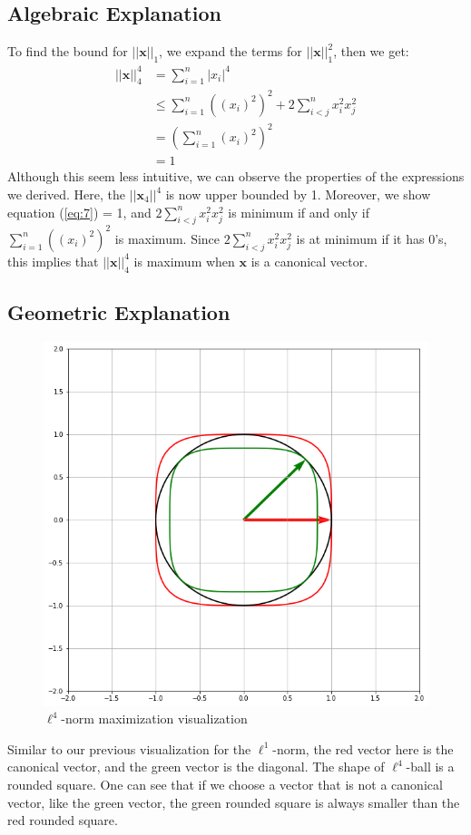 \documentclass[11pt]{article}
\begin{document}
\subsection{Algebraic Explanation}
	To find the bound for $||\bm{x}||_1$, we expand the terms for $||\bm{x}||_1^2$, then we get:
	\begin{align}
    	||\bm{x}||_4^4 
    		&= \sum^{n}_{i=1} |x_{i}|^{4} \\
			&\leq \sum^{n}_{i=1} ((x_{i})^{2})^{2} + 2\sum^{n}_{i<j} x_{i}^{2}x_{j}^{2}\label{eq:7}\\
			&= (\sum^{n}_{i=1} (x_{i})^2)^{2} \\
			&= 1
	\end{align}
	Although this seem less intuitive, we can observe the properties of the expressions we derived. Here, the $||\bm{x}_{4}||^{4}$
	is now upper bounded by 1. Moreover, we show equation (\ref{eq:7}) = 1, and $2\sum^{n}_{i<j} x_{i}^{2}x_{j}^{2}$
	is minimum if and only if $\sum^{n}_{i=1} ((x_{i})^{2})^{2}$ is maximum. Since $2\sum^{n}_{i<j} x_{i}^{2}x_{j}^{2}$ is at minimum 
	if it has 0's, this implies that $||\bm{x}||_4^4$ is maximum when $\bm{x}$ is a canonical vector. 
	

\subsection{Geometric Explanation}
    \begin{figure}[h]
        \centering
        \includegraphics[scale=0.4]{l4norm_bound.png}
        \caption{$\ell^{4}$-norm maximization visualization}
        \label{fig:l4_bound}
    \end{figure}
    Similar to our previous visualization for the $\ell^{1}$-norm, the red vector here is the canonical vector, and the green 
    vector is the diagonal. The shape of $\ell^{4}$-ball is a rounded square. One can see that if we choose a vector that is not 
    a canonical vector, like the green vector, the green rounded square is always smaller than the red rounded square. 
    
\end{document}
